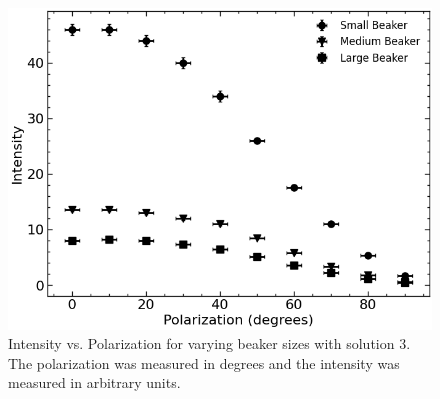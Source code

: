 \begin{figure}[H]
    \begin{center}
        \includegraphics[width=\columnwidth]{../figures/solution3.png}
    \end{center}
    \caption{Intensity vs. Polarization for varying beaker sizes with solution 3. The polarization was measured in degrees and the intensity was measured in arbitrary units.}
    \label{fig:solution3}
\end{figure}

